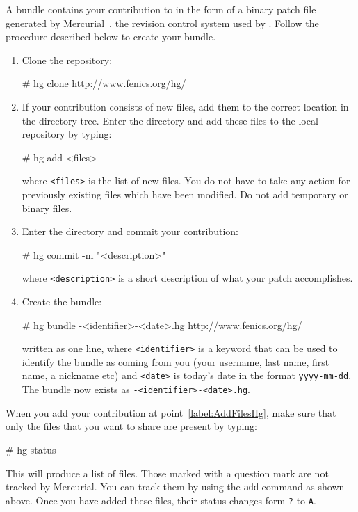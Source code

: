A bundle contains your contribution to \package{} in the form of a 
binary patch file  generated by Mercurial~\cite{www:Mercurial},  
the revision control system used by \package{}. 
Follow the procedure described below to create your bundle.
\begin{enumerate}
\item
  Clone the \package{} repository:
  \begin{macrocode}
# hg clone http://www.fenics.org/hg/\packagett{}
  \end{macrocode}
\item \label{label:AddFilesHg} If your contribution consists of new files, 
  add them to the 
  correct location in the \package{} directory tree. Enter the \package{}
  directory and add these files to the local repository by typing:
  \begin{macrocode}
# hg add <files>
  \end{macrocode}
  where \texttt{<files>} is the list of new files.
  You do not have to take any action for previously existing files 
  which have been modified. Do not add temporary or binary files. 
\item Enter the \package{} directory and commit your contribution:
  \begin{macrocode}
# hg commit -m "<description>"
  \end{macrocode}
  where \texttt{<description>} is a short description of what 
  your patch accomplishes.
\item Create the bundle:
  \begin{macrocode}
# hg bundle \packagett{}-<identifier>-<date>.hg 
  http://www.fenics.org/hg/\packagett{}
  \end{macrocode}
  written as one line, where \texttt{<identifier>} is a keyword that
  can be used to identify the bundle as coming from you (your username,
  last name, first name, a nickname etc) and \texttt{<date>} is
  today's date in the format \texttt{yyyy-mm-dd}.\\
  The bundle now exists as \texttt{\packagett{}-<identifier>-<date>.hg}.
\end{enumerate}

When you add your contribution at point~\ref{label:AddFilesHg}, 
make sure that only the files 
that you want to share are present by typing:
\begin{macrocode}
# hg status 
\end{macrocode}
This will produce a list of files. Those marked with a question mark 
are not tracked by Mercurial. You can track them by using the
\texttt{add}  command as shown above. Once you have 
added these files, their status changes form  \texttt{?} to \texttt{A}.
  
